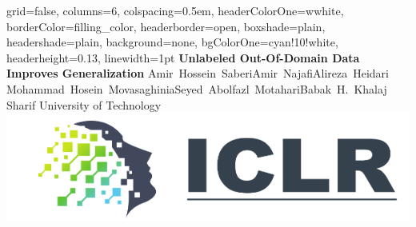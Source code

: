 \documentclass[
  landscape,
  custompaper,
  fontscale=0.292,
  paperwidth=160cm,
  paperheight=91cm
]{baposter}
\begin{document}
\begin{poster}{
  grid=false,
  columns=6,
  colspacing=0.5em,
  headerColorOne=wwhite,
  borderColor=filling_color,
  headerborder=open,
  boxshade=plain,
  headershade=plain,
  background=none,
  bgColorOne=cyan!10!white,
  headerheight=0.13\textheight,
  linewidth=1pt
}
{
  \hspace{0.01\textwidth}%
}
{
  \centering
  \sc\huge\bfseries Unlabeled Out-Of-Domain Data Improves Generalization
}
{
  \centering
  \vspace{0.3em}
  Amir~Hossein~Saberi\quad Amir~Najafi\quad  Alireza~Heidari\\[-0.1em]
  Mohammad~Hosein~Movasaghinia\quad Seyed~Abolfazl~Motahari\quad Babak~H.~Khalaj\\[0.5em]
  Sharif University of Technology
}
{
  \centering
  \includegraphics[width=0.16\linewidth]{logo/ICLR2023.png}
}









\end{poster}
\end{document}
